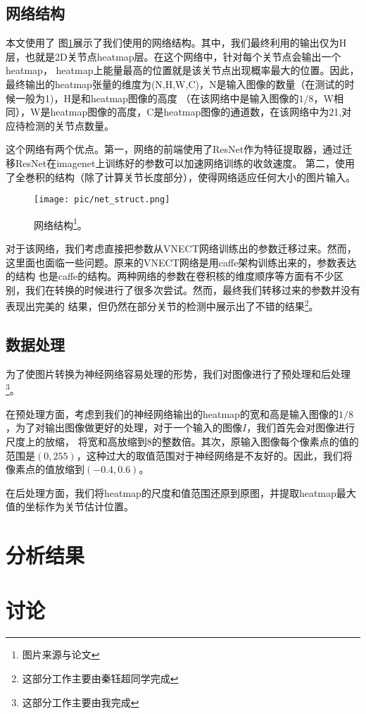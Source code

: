\documentclass[a4paper, 10pt]{article}
\begin{document}
\subsection{网络结构}
本文使用了
图\ref{pic:net_struct}展示了我们使用的网络结构。其中，我们最终利用的输出仅为H层，也就是2D关节点heatmap层。在这个网络中，针对每个关节点会输出一个heatmap，
heatmap上能量最高的位置就是该关节点出现概率最大的位置。因此，最终输出的heatmap张量的维度为(N,H,W,C)，N是输入图像的数量（在测试的时候一般为1)，H是和heatmap图像的高度
（在该网络中是输入图像的$1/8$，W相同），W是heatmap图像的高度，C是heatmap图像的通道数，在该网络中为21,对应待检测的关节点数量。

这个网络有两个优点。第一，网络的前端使用了ResNet\cite{he2016deep}作为特征提取器，通过迁移ResNet在imagenet上训练好的参数可以加速网络训练的收敛速度。
第二，使用了全巻积的结构（除了计算关节长度部分），使得网络适应任何大小的图片输入。

\begin{figure}[ht!]
    \centering
    \texttt{[image: pic/net\_struct.png]}
    \label{pic:net_struct}
    \caption{网络结构\footnote{图片来源与论文\cite{mehta2017vnect}}。}
\end{figure}

对于该网络，我们考虑直接把参数从VNECT网络训练出的参数迁移过来。然而，这里面也面临一些问题。原来的VNECT网络是用caffe架构训练出来的，参数表达的结构
也是caffe的结构。两种网络的参数在卷积核的维度顺序等方面有不少区别，我们在转换的时候进行了很多次尝试。然而，最终我们转移过来的参数并没有表现出完美的
结果，但仍然在部分关节的检测中展示出了不错的结果\footnote{这部分工作主要由秦钰超同学完成}。

\subsection{数据处理}
为了使图片转换为神经网络容易处理的形势，我们对图像进行了预处理和后处理\footnote{这部分工作主要由我完成}。

在预处理方面，考虑到我们的神经网络输出的heatmap的宽和高是输入图像的$1/8$，为了对输出图像做更好的处理，对于一个输入的图像$I$，我们首先会对图像进行尺度上的放缩，
将宽和高放缩到8的整数倍。其次，原输入图像每个像素点的值的范围是$(0,255)$，这种过大的取值范围对于神经网络是不友好的。因此，我们将像素点的值放缩到$(-0.4,0.6)$。

在后处理方面，我们将heatmap的尺度和值范围还原到原图，并提取heatmap最大值的坐标作为关节估计位置。

\section{分析结果}


\section{讨论}





\end{document}
